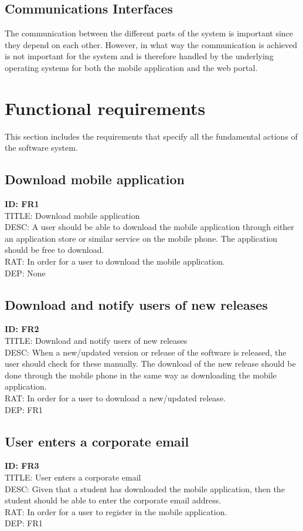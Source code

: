 \documentclass{scrreprt}
\begin{document}
\subsection{Communications Interfaces}
The communication between the different parts of the system is important since they depend on each
other. However, in what way the communication is achieved is not important for the system and is
therefore handled by the underlying operating systems for both the mobile application and the web portal.

\section{Functional requirements}
This section includes the requirements that specify all the fundamental actions of the software system.
\subsection{Download mobile application}
\textbf{ID: FR1}\\
TITLE: Download mobile application\\
DESC: A user should be able to download the mobile application through either an application store or
similar service on the mobile phone. The application should be free to download.\\
RAT: In order for a user to download the mobile application.\\
DEP: None

\subsection{Download and notify users of new releases}
\textbf{ID: FR2}\\
TITLE: Download and notify users of new releases\\
DESC: When a new/updated version or release of the software is released, the user should check for these
manually. The download of the new release should be done through the mobile phone in the same way as
downloading the mobile application.\\
RAT: In order for a user to download a new/updated release.\\
DEP: FR1

\subsection{User enters a corporate email}
\textbf{ID: FR3}\\
TITLE: User enters a corporate email\\
DESC: Given that a student has downloaded the mobile application, then the student should be able to enter the corporate email address.\\
RAT: In order for a user to register in the mobile application.\\
DEP: FR1
\end{document}
